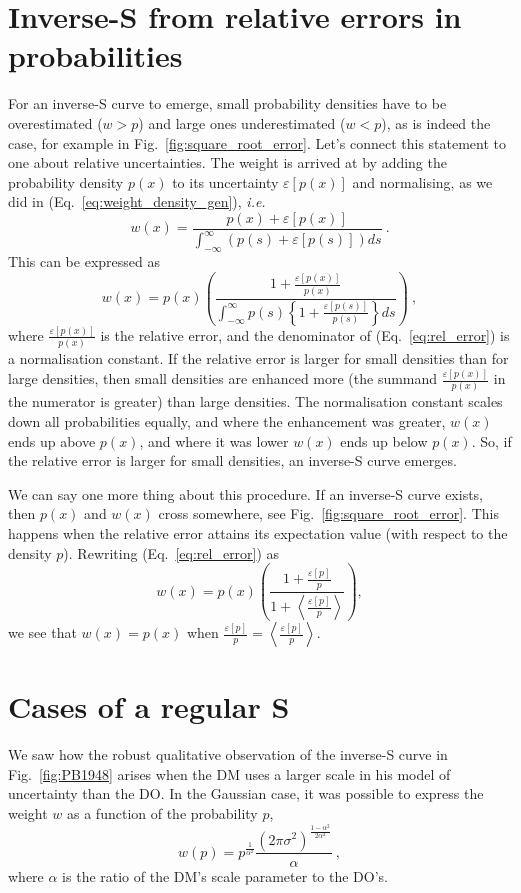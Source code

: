 \documentclass[a4paper, 12pt]{article}
\newcommand{\ave}[1]{\left\langle#1 \right\rangle}
\newcommand{\elabel}[1]{\label{eq:#1}}
\newcommand{\eref}[1]{(Eq.~\ref{eq:#1})}
\newcommand{\fref}[1]{Fig.~\ref{fig:#1}}
\newcommand{\seclabel}[1]{\label{sec:#1}}
\newcommand{\ie}{\textit{i.e.}\xspace}
\newcommand{\be}{\begin{equation}}
\newcommand{\ee}{\end{equation}}
\newcommand{\err}[1]{\varepsilon\left[#1\right]}
\begin{document}
\newpage
\printbibliography

\appendix

\newpage
\section{Inverse-S from relative errors in probabilities}
\seclabel{relative_errors}

For an inverse-S curve to emerge, small probability densities have to be overestimated ($w>p$) and large ones underestimated ($w<p$), as is indeed the case, for example in \fref{square_root_error}. Let's connect this statement to one about relative uncertainties. The weight is arrived at by adding the probability density $p(x)$ to its uncertainty $\err{p(x)}$ and normalising, as we did in \eref{weight_density_gen}, \ie
\be
w(x)=\frac{p(x)+\err{p(x)}}{\int_{-\infty}^{\infty} \left( p(s)+\err{p(s)} \right) ds}~.
\ee
This can be expressed as
\be
w(x)=p(x) \left(\frac{1+\frac{\err{p(x)}}{p(x)}}{\int_{-\infty}^{\infty} p(s)\left\{1+\frac{\err{p(s)}}{p(s)}\right\} ds}\right)~,
\elabel{rel_error}
\ee
where $\frac{\err{p(x)}}{p(x)}$ is the relative error, and the denominator of \eref{rel_error} is a normalisation constant. If the relative error is larger for small densities than for large densities, then small densities are enhanced more (the summand $\frac{\err{p(x)}}{p(x)}$ in the numerator is greater) than large densities. The normalisation constant scales down all probabilities equally, and where the enhancement was greater, $w(x)$ ends up above $p(x)$, and where it was lower $w(x)$ ends up below $p(x)$. So, if the relative error is larger for small densities, an inverse-S curve emerges.

We can say one more thing about this procedure. If an inverse-S curve exists, then $p(x)$ and $w(x)$ cross somewhere, see \fref{square_root_error}. This happens when the relative error attains its expectation value (with respect to the density $p$). Rewriting \eref{rel_error} as
\be
w(x)=p(x) \left(\frac{1+\frac{\err{p}}{p}}{1+\ave{\frac{\err{p}}{p}}}\right),
\ee
we see that $w(x)=p(x)$ when $\frac{\err{p}}{p}=\ave{\frac{\err{p}}{p}}.$

\newpage
\section{Cases of a regular S}
\seclabel{Scurve}

We saw how the robust qualitative observation of the inverse-S curve in \fref{PB1948} arises when the DM uses a larger scale in his model of uncertainty than the DO. In the Gaussian case, it was possible to express the weight $w$ as a function of the probability $p$,
\be
w(p)= p^{\frac{1}{\alpha^2}} \frac{\left(2\pi\sigma^2\right)^{\frac{1-\alpha^2}{2\alpha^2}}}{\alpha} ~,
\ee
where $\alpha$ is the ratio of the DM's scale parameter to the DO's.
\end{document}
